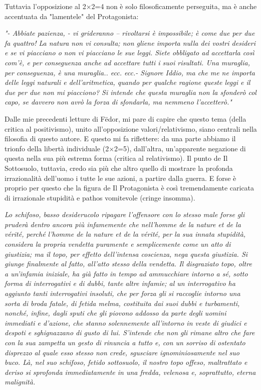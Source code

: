 \documentclass[12pt,a4paper]{report}
\theoremstyle{definition}
\theoremstyle{Theorem}
\theoremstyle{definition}
\theoremstyle{definition}
\theoremstyle{definition}
\begin{document}
Tuttavia l'opposizione al 2$\times$2=4 non è solo filosoficamente perseguita, ma è anche accentuata da "lamentele" del Protagonista: \\
\begin{center}
\textit{
	"- Abbiate pazienza, - vi grideranno – rivoltarsi è impossibile; è come due per due fa quattro! La natura non vi consulta; non gliene importa nulla dei vostri desideri e se vi piacciano o non vi piacciano le sue leggi. Siete obbligato ad accettarla così com'è, e per conseguenza anche ad accettare tutti i suoi risultati. Una muraglia, per conseguenza, è una muraglia.. ecc. ecc.-
	Signore Iddio, ma
	che me ne importa delle leggi naturali e dell’aritmetica, quando per qualche
	ragione queste leggi e il due per due non mi piacciono? Si intende che questa
	muraglia non la sfonderò col capo, se davvero non avrò la forza di sfondarla,
	ma nemmeno l’accetterò."
}
\end{center}
Dalle mie precedenti letture di Fëdor, mi pare di capire che questo tema (della critica al positivismo), unito all'opposizione valori/relativismo, siano centrali nella filosofia di questo autore. E questo mi fa riflettere: da una parte abbiamo il trionfo della libertà individuale (2$\times$2=5), dall'altra, un'apparente negazione di questa nella sua più estrema forma (critica al relativismo). Il punto de Il Sottosuolo, tuttavia, credo sia più che altro quello di mostrare la profonda irrazionalità dell'uomo i tutte le sue azioni, a partire dalla guerra. E forse è proprio per questo che la figura de Il Protagonista è così tremendamente caricata di irrazionale stupidità e pathos vomitevole (cringe insomma). 
\begin{center}
	\textit{ Lo schifoso, basso desiderucolo ripagare l'offensore con lo stesso male forse gli pruderà dentro ancora più infamemente che nell'homme de la nature et de la vérité, perché l'homme de la nature et de la vérité, per la sua innata stupidità, considera la propria vendetta puramente e semplicemente come un atto di giustizia; ma il topo, per effetto dell'intensa coscienza, nega questa giustizia. Si giunge finalmente al fatto, all'atto stesso della vendetta. Il disgraziato topo, oltre a un'infamia iniziale, ha già fatto in tempo ad ammucchiare intorno a sé, sotto forma di interrogativi e di dubbi, tante altre infamie; al un interrogativo ha aggiunto tanti interrogativi insoluti, che per forza gli si raccoglie intorno una sorta di broda fatale, di fetida melma,
		costituita dai suoi dubbi e turbamenti, nonché, infine, dagli sputi che gli piovono addosso
		da parte degli uomini immediati e d'azione, che stanno solennemente all'intorno in veste di giudici e despoti e sghignazzano di gusto di lui. S'intende che non gli rimane altro che fare con la sua zampetta un gesto di rinuncia a tutto e, con un sorriso di ostentato disprezzo al quale esso stesso non crede, sgusciare ignominiosamente nel suo buco. Là, nel suo schifoso,
		fetido sottosuolo, il nostro topo offeso, maltrattato e deriso si sprofonda immediatamente in una fredda, velenosa e, soprattutto, eterna malignità.}
\end{center}
\end{document}
